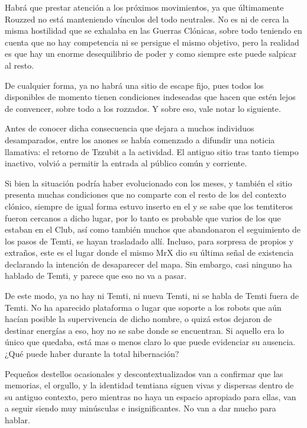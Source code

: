 \documentclass[
  spanish,
]{book}
\begin{document}
Habrá que prestar atención a los próximos movimientos, ya que últimamente Rouzzed no está manteniendo vínculos del todo neutrales. No es ni de cerca la misma hostilidad que se exhalaba en las Guerras Clónicas, sobre todo teniendo en cuenta que no hay competencia ni se persigue el mismo objetivo, pero la realidad es que hay un enorme desequilibrio de poder y como siempre este puede salpicar al resto.

De cualquier forma, ya no habrá una sitio de escape fijo, pues todos los disponibles de momento tienen condiciones indeseadas que hacen que estén lejos de convencer, sobre todo a los rozzados. Y sobre eso, vale notar lo siguiente.

Antes de conocer dicha consecuencia que dejara a muchos individuos desamparados, entre los anones se había comenzado a difundir una noticia llamativa: el retorno de Tzzubit a la actividad. El antiguo sitio tras tanto tiempo inactivo, volvió a permitir la entrada al público común y corriente.

Si bien la situación podría haber evolucionado con los meses, y también el sitio presenta muchas condiciones que no comparte con el resto de los del contexto clónico, siempre de igual forma estuvo inserto en el y se sabe que los temtiteros fueron cercanos a dicho lugar, por lo tanto es probable que varios de los que estaban en el Club, así como también muchos que abandonaron el seguimiento de los pasos de Temti, se hayan trasladado allí. Incluso, para sorpresa de propios y extraños, este es el lugar donde el mismo MrX dio su última señal de existencia declarando la intención de desaparecer del mapa. Sin embargo, casi ninguno ha hablado de Temti, y parece que eso no va a pasar.

De este modo, ya no hay ni Temti, ni nueva Temti, ni se habla de Temti fuera de Temti. No ha aparecido plataforma o lugar que soporte a los robots que aún hacían posible la supervivencia de dicho nombre, o quizá estos dejaron de destinar energías a eso, hoy no se sabe donde se encuentran. Si aquello era lo único que quedaba, está mas o menos claro lo que puede evidenciar su ausencia. ¿Qué puede haber durante la total hibernación?

Pequeños destellos ocasionales y descontextualizados van a confirmar que las memorias, el orgullo, y la identidad temtiana siguen vivas y dispersas dentro de su antiguo contexto, pero mientras no haya un espacio apropiado para ellas, van a seguir siendo muy minúsculas e insignificantes. No van a dar mucho para hablar.
\end{document}
